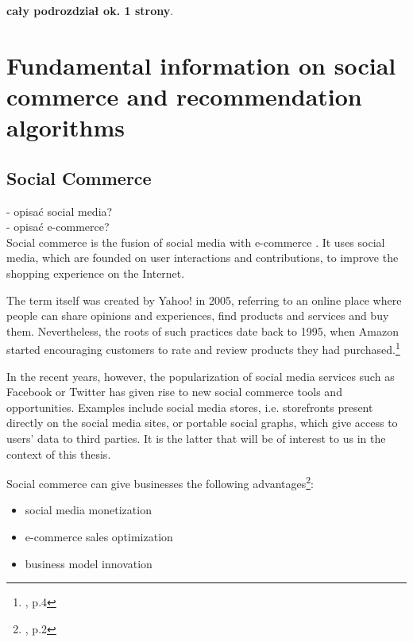 \documentclass[12pt]{report}
\begin{document}
{\bf cały podrozdział ok. 1 strony}.




\chapter[Fundamental information on social...]{Fundamental information on social commerce and recommendation algorithms} \label{fundamental_info}

\section{Social Commerce}

- opisać social media?\\
- opisać e-commerce?\\

Social commerce is the fusion of social media with e-commerce \cite{social_commerce_syzygy}. It uses social media, which are founded on user interactions and contributions, to improve the shopping experience on the Internet.

The term itself was created by Yahoo! in 2005, referring to an online place where people can share opinions and experiences, find products and services and buy them. Nevertheless, the roots of such practices date back to 1995, when Amazon started encouraging customers to rate and review products they had purchased.\footnote{\cite{social_commerce_syzygy}, p.4}

In the recent years, however, the popularization of social media services such as Facebook or Twitter has given rise to new social commerce tools and opportunities. Examples include social media stores, i.e. storefronts present directly on the social media sites, or portable social graphs, which give access to users' data to third parties. It is the latter that will be of interest to us in the context of this thesis.


Social commerce can give businesses the following advantages\footnote{\cite{social_commerce_syzygy}, p.2}:
\begin{itemize}
\item social media monetization
\item e-commerce sales optimization
\item business model innovation
\end{itemize}
\end{document}
